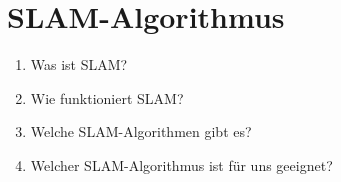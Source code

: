 \section{SLAM-Algorithmus}

\begin{enumerate}
    \item Was ist SLAM?
    \item Wie funktioniert SLAM?
    \item Welche SLAM-Algorithmen gibt es?
    \item Welcher SLAM-Algorithmus ist für uns geeignet?

\end{enumerate}

\newpage
